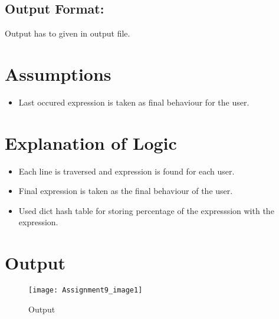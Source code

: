 \documentclass[a4paper,12pt]{article}
\begin{document}
  
\subsection{Output Format:}

Output has to given in output file.


  \newpage
  
    \section{Assumptions}
  
  \begin{small}
    
    \begin{itemize}
      \item Last occured expression is taken as final behaviour for the user.
      
    \end{itemize}
     
    
   
  \end{small}
    
  \newpage
  
    \section{Explanation of Logic}
  
  \begin{small}
  \begin{itemize}
  

    \item Each line is traversed and expression is found for each user.
   \item Final expression is taken as the final behaviour of the user.
   \item Used dict hash table for storing percentage of the expresssion with the expression.
      
      
    \end{itemize}
  \end{small}
     
  \newpage
  
    \section{Output}
  
  \begin{figure}[h]
    \centering
    \texttt{[image: Assignment9\_image1]}\\
    \scriptsize\caption{Output}
  \end{figure}
\end{document}

